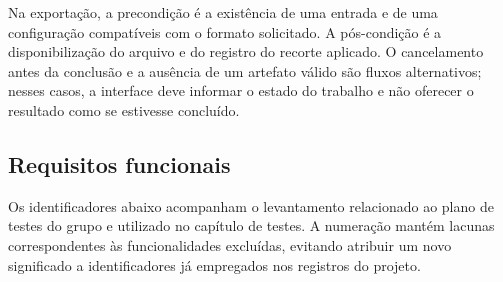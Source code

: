 Na exportação, a precondição é a existência de uma entrada e de uma configuração compatíveis com o formato solicitado. A pós-condição é a disponibilização do arquivo e do registro do recorte aplicado. O cancelamento antes da conclusão e a ausência de um artefato válido são fluxos alternativos; nesses casos, a interface deve informar o estado do trabalho e não oferecer o resultado como se estivesse concluído.

\subsection{Requisitos funcionais}

Os identificadores abaixo acompanham o levantamento relacionado ao plano de testes do grupo e utilizado no capítulo de testes. A numeração mantém lacunas correspondentes às funcionalidades excluídas, evitando atribuir um novo significado a identificadores já empregados nos registros do projeto.

